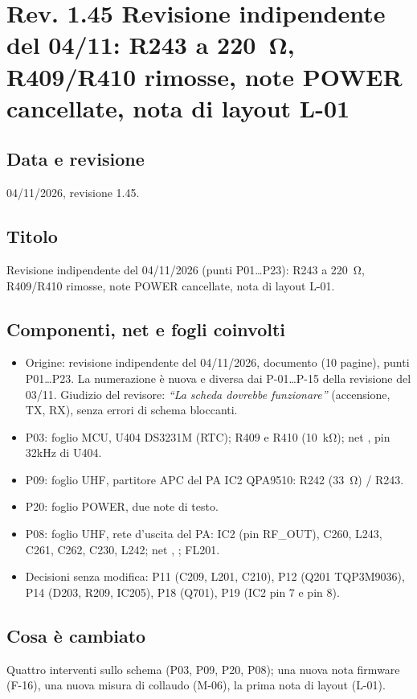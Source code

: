 \clearpage
\section[Rev. 1.45 -- Revisione del 04/11: R243 a 220 ohm, R409/R410 rimosse, nota L-01]{Rev. 1.45 \textendash{} Revisione indipendente del 04/11: R243 a \SI{220}{\ohm}, R409/R410 rimosse, note POWER cancellate, nota di layout L-01}

\subsection{Data e revisione}
04/11/2026, revisione 1.45.

\subsection{Titolo}
Revisione indipendente del 04/11/2026 (punti P01\ldots P23): R243 a \SI{220}{\ohm}, R409/R410 rimosse, note POWER cancellate, nota di layout L-01.

\subsection{Componenti, net e fogli coinvolti}
\begin{itemize}
\item Origine: revisione indipendente del 04/11/2026, documento  (10 pagine), punti P01\ldots P23. La numerazione è nuova e diversa dai P-01\ldots P-15 della revisione del 03/11. Giudizio del revisore: \emph{``La scheda dovrebbe funzionare''} (accensione, TX, RX), senza errori di schema bloccanti.
\item P03: foglio MCU, U404 DS3231M (RTC); R409 e R410 (\SI{10}{\kilo\ohm}); net , pin 32kHz di U404.
\item P09: foglio UHF, partitore APC del PA IC2 QPA9510: R242 (\SI{33}{\ohm}) / R243.
\item P20: foglio POWER, due note di testo.
\item P08: foglio UHF, rete d'uscita del PA: IC2 (pin RF\_OUT), C260, L243, C261, C262, C230, L242; net , ; FL201.
\item Decisioni senza modifica: P11 (C209, L201, C210), P12 (Q201 TQP3M9036), P14 (D203, R209, IC205), P18 (Q701), P19 (IC2 pin 7 e pin 8).
\end{itemize}

\subsection{Cosa è cambiato}
Quattro interventi sullo schema (P03, P09, P20, P08); una nuova nota firmware (F-16), una nuova misura di collaudo (M-06), la prima nota di layout (L-01).

